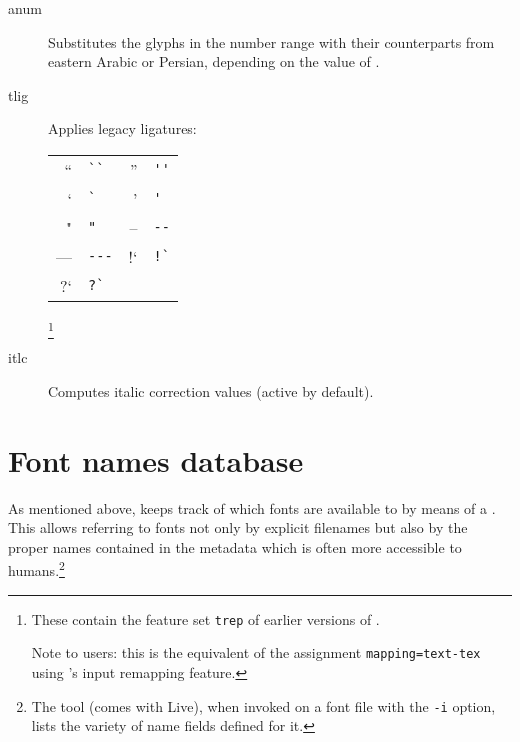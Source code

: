 \begin{description}

  \item [anum]
          Substitutes the glyphs in the  number range
          with their counterparts from eastern Arabic or Persian,
          depending on the value of .

  \item [tlig]
          Applies legacy \TEX ligatures:

          \begin{tabular}{rlrl}
             ``  &  \verb|``|  &  ''  &  \verb|''|  \\
             `   &  \verb|`|   &  '   &  \verb|'|   \\
             "   &  \verb|"|   &  --  &  \verb|--|  \\
             --- &  \verb|---| &  !`  &  \verb|!`|  \\
             ?`  &  \verb|?`|  &      &             \\
          \end{tabular}

          \footnote{%
            These contain the feature set \verb|trep| of earlier
            versions of .

            Note to \XETEX users: this is the equivalent of the
            assignment \verb|mapping=text-tex| using \XETEX's input
            remapping feature.
          }

  \item [itlc]
          Computes italic correction values (active by default).

\end{description}



\section{Font names database}
\label{sec:fontdb}

As mentioned above,  keeps track of which
fonts are available to \LUATEX by means of a .
%
This allows referring to fonts not only by explicit filenames but
also by the proper names contained in the metadata which is often
more accessible to humans.\footnote{%
  The tool \href{http://www.lcdf.org/type/}{} (comes
  with \TEX Live), when invoked on a font file with the \verb|-i|
  option, lists the variety of name fields defined for it.
}

